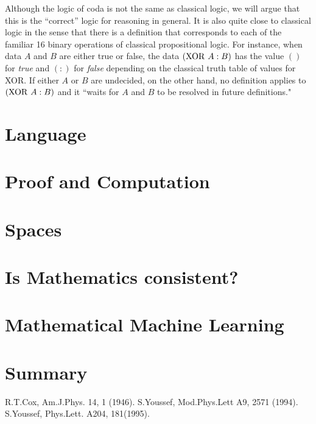 \documentclass[11pt]{article}
\begin{document}
    Although the logic of coda is not the same as classical logic, we will argue that this is the ``correct'' logic for reasoning in general.  It is also quite close to classical logic in the sense that there is a definition that corresponds to each of the familiar 16 binary operations of classical propositional logic.  For instance, when data $A$ and $B$ are either true or false, the data $({\rm XOR}\ A:B)$ has the value $()$ for {\it true} and $(:)$ for {\it false} depending on the classical truth table of values for XOR.  If either $A$ or $B$ are undecided, on the other hand, no definition applies to $({\rm XOR}\ A:B)$ and it ``waits for $A$ and $B$ to be resolved in future definitions."
    
\section{Language}


\section{Proof and Computation}
\section{Spaces}
\section{Is Mathematics consistent?}
\section{Mathematical Machine Learning}
\section{Summary} 


\begin{thebibliography}{10}
 R.T.Cox, Am.J.Phys. 14, 1 (1946).
 S.Youssef, Mod.Phys.Lett A9, 2571 (1994).
 S.Youssef, Phys.Lett. A204, 181(1995).

\end{thebibliography}
\end{document}
